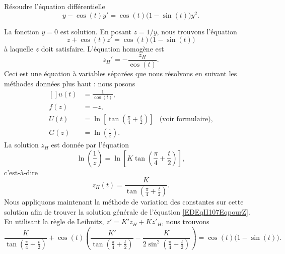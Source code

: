 \begin{example} \label{ExYCPtxgZ}
	Résoudre l'équation différentielle
	\begin{equation}
		y-\cos(t)y'=\cos(t)\big(1-\sin(t)\big)y^2.
	\end{equation}

	La fonction \( y=0\) est solution. En posant \( z=1/y\), nous trouvons l'équation
	\begin{equation}		\label{EDEqII107EqpourZ}
		z+\cos(t)z'=\cos(t)\big(1-\sin(t)\big)
	\end{equation}
	à laquelle \( z\) doit satisfaire. L'équation homogène est
	\begin{equation}
		z_H'=-\frac{ z_H }{ \cos(t) }.
	\end{equation}
	Ceci est une équation à variables séparées que nous résolvons en suivant les méthodes données plus haut : nous posons
	\begin{equation}		\label{EqEDufUGII107}
		\begin{aligned}[]
			u(t) & =\frac{1}{ \cos(t) },                                                                               \\
			f(z) & =-z,                                                                                                \\
			U(t) & =\ln\left[ \tan\left( \frac{ \pi }{ 4 }+\frac{ t }{ 2 } \right) \right] & \text{(voir formulaire)}, \\
			G(z) & =\ln\left( \frac{1}{ z } \right).
		\end{aligned}
	\end{equation}
	La solution \( z_H\) est donnée par l'équation
	\begin{equation}
		\ln\left( \frac{1}{ z } \right)=\ln\left[ K\tan\left( \frac{ \pi }{ 4 }+\frac{ t }{ 2 } \right) \right],
	\end{equation}
	c'est-à-dire
	\begin{equation}
		z_H(t)=\frac{ K }{ \tan\left( \frac{ \pi }{ 4 }+\frac{ t }{ 2 } \right) }.
	\end{equation}
	Nous appliquons maintenant la méthode de variation des constantes sur cette solution afin de trouver la solution générale de l'équation \eqref{EDEqII107EqpourZ}. En utilisant la règle de Leibnitz, \( z'=K'z_H+Kz'_H\), nous trouvons
	\begin{equation}
		\frac{ K }{ \tan\left( \frac{ \pi }{ 4 }+\frac{ t }{ 2 } \right) }+\cos(t)\left( \frac{ K' }{  \tan\left( \frac{ \pi }{ 4 }+\frac{ t }{ 2 } \right) }-\frac{ K }{ 2\sin^2 \left( \frac{ \pi }{ 4 }+\frac{ t }{ 2 } \right)  } \right)=\cos(t)\big( 1-\sin(t) \big).

\end{equation}
\end{example}
